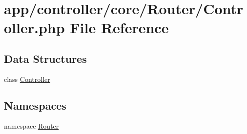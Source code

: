 \hypertarget{_controller_8php}{\section{app/controller/core/\-Router/\-Controller.php File Reference}
\label{_controller_8php}
}
\subsection*{Data Structures}
\begin{DoxyCompactItemize}
\item 
class \hyperlink{class_router_1_1_controller}{Controller}
\end{DoxyCompactItemize}
\subsection*{Namespaces}
\begin{DoxyCompactItemize}
\item 
namespace \hyperlink{namespace_router}{Router}
\end{DoxyCompactItemize}
